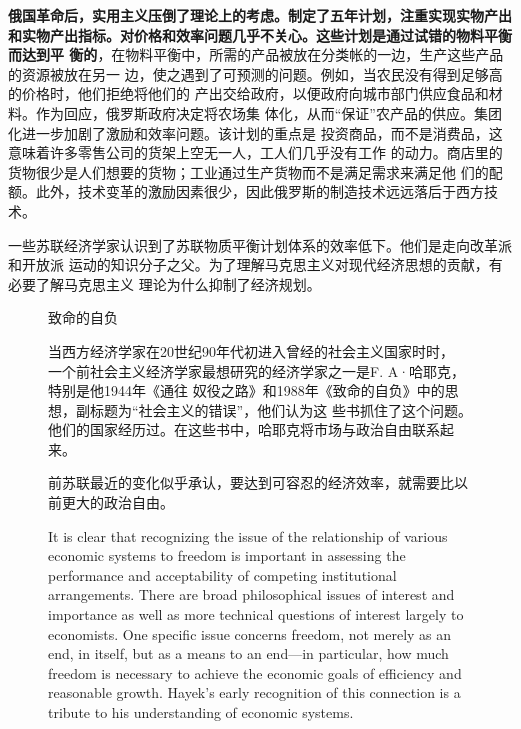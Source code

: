 \textbf{俄国革命后，实用主义压倒了理论上的考虑。制定了五年计划，注重实现实物产出
和实物产出指标。对价格和效率问题几乎不关心。这些计划是通过试错的物料平衡而达到平
衡的}，在物料平衡中，所需的产品被放在分类帐的一边，生产这些产品的资源被放在另一
边，使之遇到了可预测的问题。例如，当农民没有得到足够高的价格时，他们拒绝将他们的
产出交给政府，以便政府向城市部门供应食品和材料。作为回应，俄罗斯政府决定将农场集
体化，从而“保证”农产品的供应。集团化进一步加剧了激励和效率问题。该计划的重点是
投资商品，而不是消费品，这意味着许多零售公司的货架上空无一人，工人们几乎没有工作
的动力。商店里的货物很少是人们想要的货物；工业通过生产货物而不是满足需求来满足他
们的配额。此外，技术变革的激励因素很少，因此俄罗斯的制造技术远远落后于西方技术。

一些苏联经济学家认识到了苏联物质平衡计划体系的效率低下。他们是走向改革派和开放派
运动的知识分子之父。为了理解马克思主义对现代经济思想的贡献，有必要了解马克思主义
理论为什么抑制了经济规划。

\begin{figure}[ht]
\begin{mybox}{致命的自负}
  \begin{multicols}{2}当西方经济学家在20世纪90年代初进入曾经的社会主义国家时时，
一个前社会主义经济学家最想研究的经济学家之一是F. A·哈耶克，特别是他1944年《通往
奴役之路》和1988年《致命的自负》中的思想，副标题为“社会主义的错误”，他们认为这
些书抓住了这个问题。他们的国家经历过。在这些书中，哈耶克将市场与政治自由联系起来。

    前苏联最近的变化似乎承认，要达到可容忍的经济效率，就需要比以前更大的政治自由。

    It is clear that recognizing the issue of the relationship of various
economic systems to freedom is important in assessing the performance and
acceptability of competing institutional arrangements. There are broad
philosophical issues of interest and importance as well as more technical
questions of interest largely to economists. One specific issue concerns
freedom, not merely as an end, in itself, but as a means to an end—in
particular, how much freedom is necessary to achieve the economic goals of
efficiency and reasonable growth. Hayek’s early recognition of this connection
is a tribute to his understanding of economic systems.
  \end{multicols}
\end{mybox}
\end{figure}


